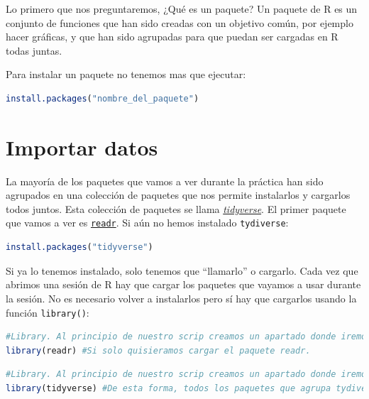\documentclass[
]{book}
\newcommand{\passthrough}[1]{#1}
\begin{document}
Lo primero que nos preguntaremos, ¿Qué es un paquete? Un paquete de R es un conjunto de funciones que han sido creadas con un objetivo común, por ejemplo hacer gráficas, y que han sido agrupadas para que puedan ser cargadas en R todas juntas.

Para instalar un paquete no tenemos mas que ejecutar:

\begin{lstlisting}[language=R]
install.packages("nombre_del_paquete")
\end{lstlisting}

\hypertarget{importar-datos}{%
\section{Importar datos}\label{importar-datos}}

La mayoría de los paquetes que vamos a ver durante la práctica han sido agrupados en una colección de paquetes que nos permite instalarlos y cargarlos todos juntos. Esta colección de paquetes se llama \href{https://www.tidyverse.org/}{\emph{tidyverse}}. El primer paquete que vamos a ver es \href{https://cran.r-project.org/web/packages/readr/readr.pdf}{\passthrough{\lstinline!readr!}}.
Si aún no hemos instalado \passthrough{\lstinline!tydiverse!}:

\begin{lstlisting}[language=R]
install.packages("tidyverse")
\end{lstlisting}

Si ya lo tenemos instalado, solo tenemos que ``llamarlo'' o cargarlo. Cada vez que abrimos una sesión de R hay que cargar los paquetes que vayamos a usar durante la sesión. No es necesario volver a instalarlos pero sí hay que cargarlos usando la función \passthrough{\lstinline!library()!}:

\begin{lstlisting}[language=R]
#Library. Al principio de nuestro scrip creamos un apartado donde iremos cargando los paquetes nos irán haciendo falta.
library(readr) #Si solo quisieramos cargar el paquete readr.
\end{lstlisting}

\begin{lstlisting}[language=R]
#Library. Al principio de nuestro scrip creamos un apartado donde iremos cargando los paquetes nos irán haciendo falta.
library(tidyverse) #De esta forma, todos los paquetes que agrupa tydiverse: ggplot2, readr, dplyr, etc. Yo usaría esta.
\end{lstlisting}
\end{document}
